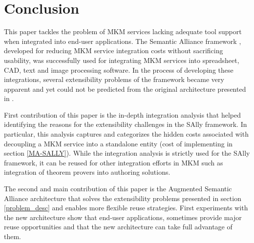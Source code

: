\documentclass{llncs}
\begin{document}
\section{Conclusion}
This paper tackles the problem of MKM services lacking adequate tool support when integrated into end-user applications. The Semantic Alliance framework \cite{DavJucKoh:safusa12}, developed for reducing MKM service integration costs without sacrificing usability, was successfully used for integrating MKM services into spreadsheet\cite{DavJucKoh:safusa12}, CAD\cite{KohlhaseEtAl:FullSemanticTransparency:2013}, text and image \cite{design2014} processing software. In the process of developing these integrations, several extensibility problems of the framework became very apparent and yet could not be predicted from the original architecture presented in \cite{DavJucKoh:safusa12}.

First contribution of this paper is the in-depth integration analysis that helped identifying the reasons for the extensibility challenges in the SAlly framework. In particular, this analysis captures and categorizes the hidden costs associated with decoupling a MKM service into a standalone entity (cost of implementing  in section \ref{MA-SALLY}). While the integration analysis is strictly used for the SAlly framework, it can be reused for other integration efforts in MKM such as integration of theorem provers into authoring solutions. 

The second and main contribution of this paper is the Augmented Semantic Alliance architecture that solves the extensibility problems presented in section \ref{problem_desc} and enables more flexible reuse strategies. First experiments with the new architecture show that end-user applications, sometimes provide major reuse opportunities and that the new architecture can take full advantage of them.



\printbibliography
\end{document}

